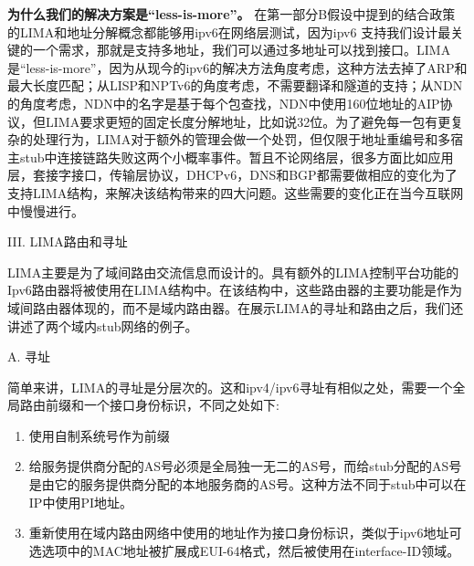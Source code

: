 \begin{flushleft}
\textbf{为什么我们的解决方案是“less-is-more”。} 在第一部分B假设中提到的结合政策的LIMA和地址分解概念都能够用ipv6在网络层测试，因为ipv6 支持我们设计最关键的一个需求，那就是支持多地址，我们可以通过多地址可以找到接口。LIMA是“less-is-more”，因为从现今的ipv6的解决方法角度考虑，这种方法去掉了ARP和最大长度匹配；从LISP和NPTv6的角度考虑，不需要翻译和隧道的支持；从NDN的角度考虑，NDN中的名字是基于每个包查找，NDN中使用160位地址的AIP协议，但LIMA要求更短的固定长度分解地址，比如说32位。为了避免每一包有更复杂的处理行为，LIMA对于额外的管理会做一个处罚，但仅限于地址重编号和多宿主stub中连接链路失败这两个小概率事件。暂且不论网络层，很多方面比如应用层，套接字接口，传输层协议，DHCPv6，DNS和BGP都需要做相应的变化为了支持LIMA结构，来解决该结构带来的四大问题。这些需要的变化正在当今互联网中慢慢进行。
\end{flushleft}
\begin{center}
III.	LIMA路由和寻址
\end{center}
\par LIMA主要是为了域间路由交流信息而设计的。具有额外的LIMA控制平台功能的Ipv6路由器将被使用在LIMA结构中。在该结构中，这些路由器的主要功能是作为域间路由器体现的，而不是域内路由器。在展示LIMA的寻址和路由之后，我们还讲述了两个域内stub网络的例子。
\begin{flushleft}
A.	寻址
\end{flushleft}
\par 简单来讲，LIMA的寻址是分层次的。这和ipv4/ipv6寻址有相似之处，需要一个全局路由前缀和一个接口身份标识，不同之处如下:
\begin{enumerate}
\item	使用自制系统号作为前缀
\item	给服务提供商分配的AS号必须是全局独一无二的AS号，而给stub分配的AS号是由它的服务提供商分配的本地服务商的AS号。这种方法不同于stub中可以在IP中使用PI地址。
\item   重新使用在域内路由网络中使用的地址作为接口身份标识，类似于ipv6地址可选选项中的MAC地址被扩展成EUI-64格式，然后被使用在interface-ID领域。
\end{enumerate}

